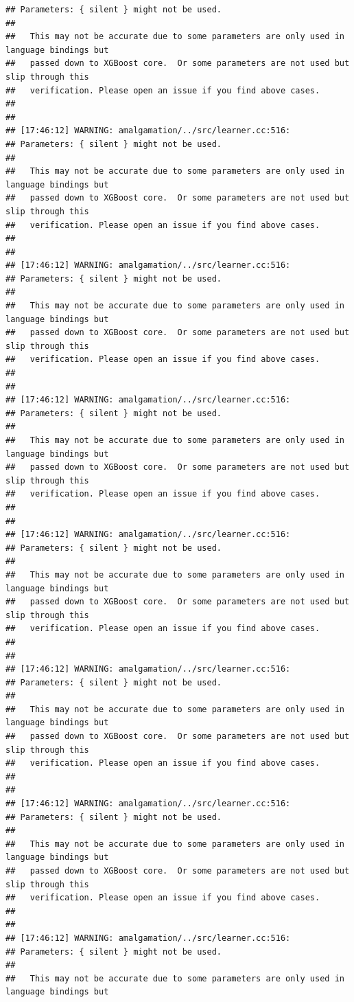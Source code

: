 \documentclass[AMS,STIX2COL]{WileyNJD-v2}\usepackage[]{graphicx}\usepackage[]{color}
\makeatletter
\newenvironment{kframe}{%
 \def\at@end@of@kframe{}%
 \ifinner\ifhmode%
  \def\at@end@of@kframe{\end{minipage}}%
  \begin{minipage}{\columnwidth}%
 \fi\fi%
 \def\FrameCommand##1{\hskip\@totalleftmargin \hskip-\fboxsep
 \colorbox{shadecolor}{##1}\hskip-\fboxsep
     \hskip-\linewidth \hskip-\@totalleftmargin \hskip\columnwidth}%
 \MakeFramed {\advance\hsize-\width
   \@totalleftmargin\z@ \linewidth\hsize
   \@setminipage}}%
 {\par\unskip\endMakeFramed%
 \at@end@of@kframe}
\newenvironment{knitrout}{}{} %
\makeatother
\begin{document}
\begin{knitrout}
\begin{kframe}
\begin{verbatim}
## Parameters: { silent } might not be used.
## 
##   This may not be accurate due to some parameters are only used in language bindings but
##   passed down to XGBoost core.  Or some parameters are not used but slip through this
##   verification. Please open an issue if you find above cases.
## 
## 
## [17:46:12] WARNING: amalgamation/../src/learner.cc:516: 
## Parameters: { silent } might not be used.
## 
##   This may not be accurate due to some parameters are only used in language bindings but
##   passed down to XGBoost core.  Or some parameters are not used but slip through this
##   verification. Please open an issue if you find above cases.
## 
## 
## [17:46:12] WARNING: amalgamation/../src/learner.cc:516: 
## Parameters: { silent } might not be used.
## 
##   This may not be accurate due to some parameters are only used in language bindings but
##   passed down to XGBoost core.  Or some parameters are not used but slip through this
##   verification. Please open an issue if you find above cases.
## 
## 
## [17:46:12] WARNING: amalgamation/../src/learner.cc:516: 
## Parameters: { silent } might not be used.
## 
##   This may not be accurate due to some parameters are only used in language bindings but
##   passed down to XGBoost core.  Or some parameters are not used but slip through this
##   verification. Please open an issue if you find above cases.
## 
## 
## [17:46:12] WARNING: amalgamation/../src/learner.cc:516: 
## Parameters: { silent } might not be used.
## 
##   This may not be accurate due to some parameters are only used in language bindings but
##   passed down to XGBoost core.  Or some parameters are not used but slip through this
##   verification. Please open an issue if you find above cases.
## 
## 
## [17:46:12] WARNING: amalgamation/../src/learner.cc:516: 
## Parameters: { silent } might not be used.
## 
##   This may not be accurate due to some parameters are only used in language bindings but
##   passed down to XGBoost core.  Or some parameters are not used but slip through this
##   verification. Please open an issue if you find above cases.
## 
## 
## [17:46:12] WARNING: amalgamation/../src/learner.cc:516: 
## Parameters: { silent } might not be used.
## 
##   This may not be accurate due to some parameters are only used in language bindings but
##   passed down to XGBoost core.  Or some parameters are not used but slip through this
##   verification. Please open an issue if you find above cases.
## 
## 
## [17:46:12] WARNING: amalgamation/../src/learner.cc:516: 
## Parameters: { silent } might not be used.
## 
##   This may not be accurate due to some parameters are only used in language bindings but

\end{verbatim}
\end{kframe}
\end{knitrout}
\end{document}
